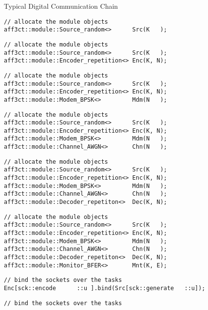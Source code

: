 \begin{frame}{Typical Digital Communication Chain}
  \begin{overprint}
  \begin{verbatim}
// allocate the module objects
aff3ct::module::Source_random<>      Src(K   );
  \end{verbatim}
  \begin{verbatim}
// allocate the module objects
aff3ct::module::Source_random<>      Src(K   );
aff3ct::module::Encoder_repetition<> Enc(K, N);
  \end{verbatim}
  \begin{verbatim}
// allocate the module objects
aff3ct::module::Source_random<>      Src(K   );
aff3ct::module::Encoder_repetition<> Enc(K, N);
aff3ct::module::Modem_BPSK<>         Mdm(N   );
  \end{verbatim}
  \begin{verbatim}
// allocate the module objects
aff3ct::module::Source_random<>      Src(K   );
aff3ct::module::Encoder_repetition<> Enc(K, N);
aff3ct::module::Modem_BPSK<>         Mdm(N   );
aff3ct::module::Channel_AWGN<>       Chn(N   );
  \end{verbatim}
  \begin{verbatim}
// allocate the module objects
aff3ct::module::Source_random<>      Src(K   );
aff3ct::module::Encoder_repetition<> Enc(K, N);
aff3ct::module::Modem_BPSK<>         Mdm(N   );
aff3ct::module::Channel_AWGN<>       Chn(N   );
aff3ct::module::Decoder_repetiton<>  Dec(K, N);
  \end{verbatim}
  \begin{verbatim}
// allocate the module objects
aff3ct::module::Source_random<>      Src(K   );
aff3ct::module::Encoder_repetition<> Enc(K, N);
aff3ct::module::Modem_BPSK<>         Mdm(N   );
aff3ct::module::Channel_AWGN<>       Chn(N   );
aff3ct::module::Decoder_repetiton<>  Dec(K, N);
aff3ct::module::Monitor_BFER<>       Mnt(K, E);
  \end{verbatim}
  \begin{verbatim}
// bind the sockets over the tasks
Enc[sck::encode      ::u ].bind(Src[sck::generate   ::u]);
  \end{verbatim}
  \begin{verbatim}
// bind the sockets over the tasks

\end{verbatim}
\end{overprint}
\end{frame}
